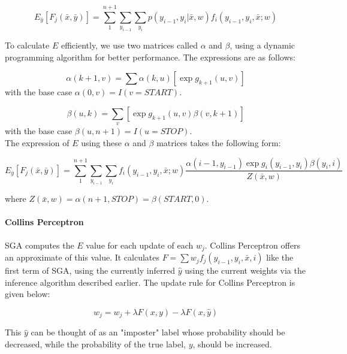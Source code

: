\documentclass[11pt,a4paper,oneside]{article}
\begin{document}
\begin{equation}
E_{\bar{y}}[F_j(\bar{x}, \bar{y})] = \sum_1^{n+1}{\sum_{y_{i-1}}{\sum_{y_i}}}p(y_{i-1},y_i|\bar{x},w)f_i(y_{i-1},y_i,\bar{x};w)
\end{equation}

To calculate $E$ efficiently, we use two matrices called $\alpha$ and $\beta$, using a dynamic programming algorithm for better performance. The expressions are as follows:

\begin{equation}
\alpha(k+1, v) = \sum{\alpha(k, u)[\exp g_{k+1}(u,v)]}
\end{equation}
with the base case $\alpha(0,v) = I(v = START)$.

\begin{equation}
\beta(u,k) = \sum_v[\exp g_{k+1}(u,v)\beta(v, k+1)]
\end{equation}
with the base case $\beta(u, n+1) = I(u = STOP)$.\\

The expression of $E$ using these $\alpha$ and $\beta$ matrices takes the following form:

\begin{equation}
E_{\bar{y}}[F_j(\bar{x}, \bar{y})] = \sum_1^{n+1}{\sum_{y_{i-1}}{\sum_{y_i}}}f_i(y_{i-1},y_i,\bar{x};w)\frac{\alpha(i-1, y_{i-1})\exp g_i(y_{i-1},y_i) \beta(y_i,i)}{Z(\bar{x}, w)}
\end{equation}

where $Z(\bar{x}, w) = \alpha(n+1, STOP) = \beta(START, 0)$.

\paragraph*{Collins Perceptron}
SGA computes the $E$ value for each update of each $w_j$. Collins Perceptron offers an approximate of this value. It calculates $F = \sum{w_jf_j(y_{i-1}, y_i, \bar{x}, i)}$ like the first term of SGA, using the currently inferred $\hat{y}$ using the current weights via the inference algorithm described earlier. The update rule for Collins Perceptron is given below:

\begin{equation}
w_j = w_j + \lambda F(x, y) - \lambda F(x, \hat{y})
\end{equation}

This $\hat{y}$ can be thought of as an "imposter" label whose probability should be decreased, while the probability of the true label, $y$, should be increased.
\end{document}
